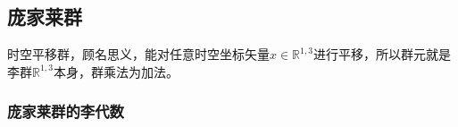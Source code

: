 
\subsection{庞家莱群}
时空平移群，顾名思义，能对任意时空坐标矢量$x\in \mathbb R^{1,3} $进行平移，所以群元就是李群$\mathbb R^{1,3}$本身，群乘法为加法。

\subsubsection{庞家莱群的李代数}